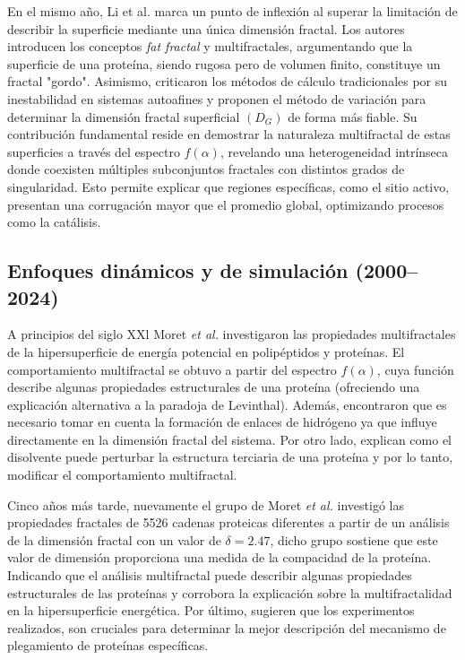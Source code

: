 En el mismo año, Li et al. \cite{HouqiangLi1991} marca un punto de inflexión al superar la limitación de describir la superficie mediante una única dimensión fractal. Los autores introducen los conceptos \textit{fat fractal} y multifractales, argumentando que la superficie de una proteína, siendo rugosa pero de volumen finito, constituye un fractal "gordo". Asimismo, criticaron los métodos de cálculo tradicionales por su inestabilidad en sistemas autoafines y proponen el método de variación para determinar la dimensión fractal superficial $(D_G)$ de forma más fiable. Su contribución fundamental reside en demostrar la naturaleza multifractal de estas superficies a través del espectro $f(\alpha)$, revelando una heterogeneidad intrínseca donde coexisten múltiples subconjuntos fractales con distintos grados de singularidad. Esto permite explicar que regiones específicas, como el sitio activo, presentan una corrugación mayor que el promedio global, optimizando procesos como la catálisis. 

\subsection{Enfoques dinámicos y de simulación (2000--2024)}


A principios del siglo XXl Moret \textit{et al.}\cite{Moret2001} investigaron las propiedades multifractales de la hipersuperficie de energía potencial en polipéptidos y proteínas. El comportamiento multifractal se obtuvo a partir del espectro $f(\alpha)$, cuya función describe algunas propiedades estructurales de una proteína (ofreciendo una explicación alternativa a la paradoja de Levinthal). Además, encontraron que es necesario tomar en cuenta la formación de enlaces de hidrógeno ya que influye directamente en la dimensión fractal del sistema. Por otro lado, explican como el disolvente puede perturbar la estructura terciaria de una proteína y por lo tanto, modificar el comportamiento multifractal.

Cinco años más tarde, nuevamente el grupo de Moret \textit{et al.} \cite{Moret2005} investigó las propiedades fractales de 5526 cadenas proteicas diferentes a partir de un análisis de la dimensión fractal con un valor de $\delta = 2.47$, dicho grupo sostiene que este valor de dimensión proporciona una medida de la compacidad de la proteína. Indicando que el análisis multifractal puede describir algunas propiedades estructurales de las proteínas y corrobora la explicación sobre la multifractalidad en la hipersuperficie energética. Por último, sugieren que los experimentos realizados, son cruciales para determinar la mejor descripción del mecanismo de plegamiento de proteínas específicas.

